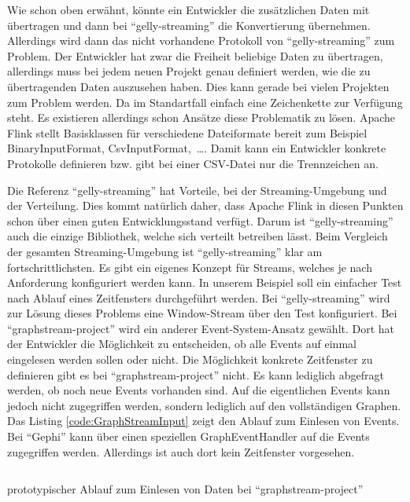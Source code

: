 Wie schon oben erwähnt, könnte ein Entwickler die zusätzlichen Daten mit
übertragen und dann bei \enquote{gelly-streaming} die Konvertierung übernehmen.
Allerdings wird dann das nicht vorhandene Protokoll von \enquote{gelly-streaming}
zum Problem. Der Entwickler hat zwar die Freiheit beliebige Daten zu übertragen,
allerdings muss bei jedem neuen Projekt genau definiert werden, wie die zu
übertragenden Daten auszusehen haben. Dies kann gerade bei vielen Projekten zum
Problem werden. Da im Standartfall einfach eine Zeichenkette zur Verfügung steht.
Es existieren allerdings schon Ansätze diese Problematik zu lösen. Apache Flink
stellt Basisklassen für verschiedene Dateiformate bereit zum Beispiel
BinaryInputFormat, CsvInputFormat,~\dots . Damit kann ein Entwickler konkrete
Protokolle definieren bzw. gibt bei einer CSV-Datei nur die Trennzeichen an.

Die Referenz \enquote{gelly-streaming} hat Vorteile, bei der Streaming-Umgebung
und der Verteilung. Dies kommt natürlich daher, dass Apache Flink in diesen
Punkten schon über einen guten Entwicklungsstand verfügt. Darum ist
\enquote{gelly-streaming} auch die einzige Bibliothek, welche sich verteilt
betreiben lässt. Beim Vergleich der gesamten Streaming-Umgebung ist
\enquote{gelly-streaming} klar am fortschrittlichsten. Es gibt ein eigenes
Konzept für Streams, welches je nach Anforderung konfiguriert werden kann. In
unserem Beispiel soll ein einfacher Test nach Ablauf eines Zeitfensters
durchgeführt werden. Bei \enquote{gelly-streaming} wird zur Lösung dieses
Problems eine Window-Stream über den Test konfiguriert. Bei \enquote{graphstream-project}
wird ein anderer Event-System-Ansatz gewählt. Dort hat der Entwickler die
Möglichkeit zu entscheiden, ob alle Events auf einmal eingelesen werden sollen
oder nicht. Die Möglichkeit konkrete Zeitfenster zu definieren gibt es bei
\enquote{graphstream-project} nicht. Es kann lediglich abgefragt werden, ob noch
neue Events vorhanden sind. Auf die eigentlichen Events kann jedoch nicht
zugegriffen werden, sondern lediglich auf den vollständigen Graphen. Das Listing
\ref{code:GraphStreamInput} zeigt den Ablauf zum Einlesen von Events. Bei \enquote{Gephi}
kann über einen speziellen GraphEventHandler auf die Events zugegriffen werden.
Allerdings ist auch dort kein Zeitfenster vorgesehen.

\begin{listing}
\inputminted[breaklines=true]{java}{../material/code/GraphStreamInput.java}
\caption{prototypischer Ablauf zum Einlesen von Daten bei \enquote{graphstream-project}}
\label{code:GraphStreamInput}
\end{listing}

